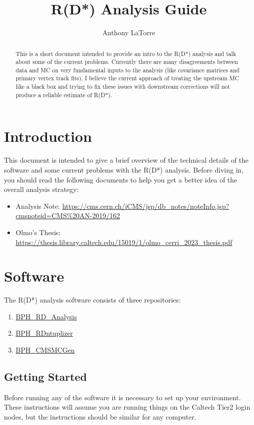 \documentclass[12pt]{report}
\title{R(D*) Analysis Guide}
\author{Anthony LaTorre}
\begin{document}
\maketitle
\tableofcontents
\begin{abstract}
This is a short document intended to provide an intro to the R(D*) analysis and
talk about some of the current problems. Currently there are many
disagreements between data and MC on very fundamental inputs to the analysis (like
covariance matrices and primary vertex track fits). I believe the current
approach of treating the upstream MC like a black box and trying to fix these
issues with downstream corrections will not produce a reliable estimate of
R(D*).
\end{abstract}
\chapter{Introduction}
This document is intended to give a brief overview of the technical details of
the software and some current problems with the R(D*) analysis. Before diving
in, you should read the following documents to help you get a better idea of
the overall analysis strategy:
\begin{itemize}
\item Analysis Note: \url{https://cms.cern.ch/iCMS/jsp/db_notes/noteInfo.jsp?cmsnoteid=CMS%20AN-2019/162}
\item Olmo's Thesis: \url{https://thesis.library.caltech.edu/15019/1/olmo_cerri_2023_thesis.pdf}
\end{itemize}
\chapter{Software}
The R(D*) analysis software consists of three repositories:
\begin{enumerate}
\item \href{https://github.com/alatorre-caltech/BPH\_RD\_Analysis}{BPH\_RD\_Analysis}
\item \href{https://github.com/alatorre-caltech/BPH\_RDntuplizer}{BPH\_RDntuplizer}
\item \href{https://github.com/alatorre-caltech/BPH\_CMSMCGen}{BPH\_CMSMCGen}
\end{enumerate}
\section{Getting Started}
Before running any of the software it is necessary to set up your environment.
These instructions will assume you are running things on the Caltech Tier2
login nodes, but the instructions should be similar for any computer.
\end{document}
